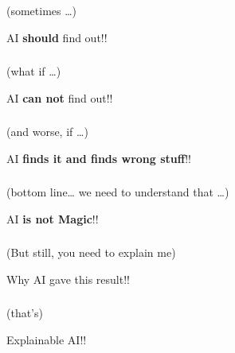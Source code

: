 \begin{frame}[fragile]\frametitle{}
\begin{center}
(sometimes \ldots)


{\Huge AI {\bf should} find out!!}
\end{center}
\end{frame}

\begin{frame}[fragile]\frametitle{}
\begin{center}
(what if \ldots)


{\Huge AI {\bf can not} find out!!}
\end{center}
\end{frame}

\begin{frame}[fragile]\frametitle{}
\begin{center}
(and worse, if \ldots)


{\Huge AI {\bf finds it and finds wrong stuff}!!}
\end{center}
\end{frame}

\begin{frame}[fragile]\frametitle{}
\begin{center}
(bottom line… we need to understand that \ldots)


{\Huge AI {\bf is not Magic}!!}
\end{center}
\end{frame}

\begin{frame}[fragile]\frametitle{}
\begin{center}
(But still, you need to explain me)


{\Huge Why AI gave this result!!}
\end{center}
\end{frame}

\begin{frame}[fragile]\frametitle{}
\begin{center}
(that's)


{\Huge Explainable AI!!}
\end{center}
\end{frame}


